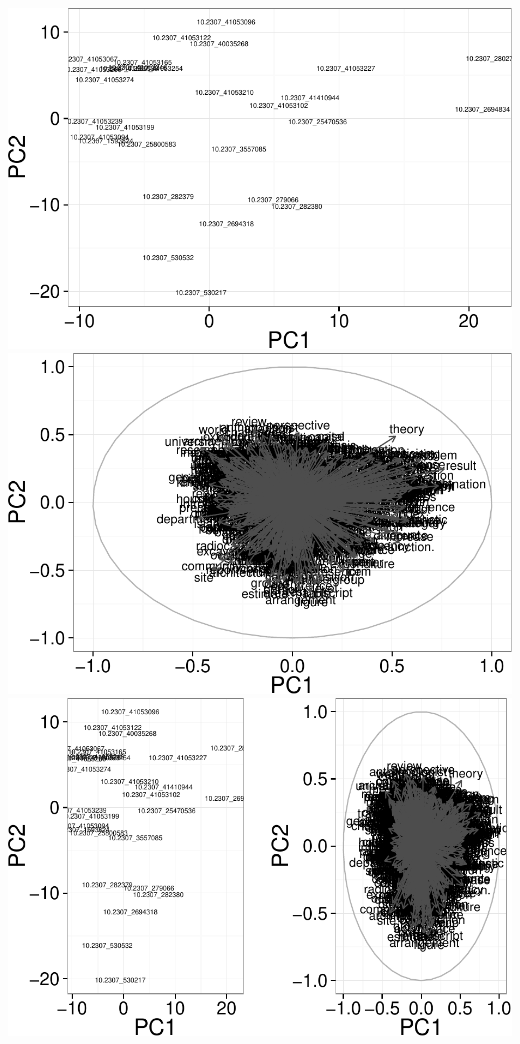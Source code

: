 \documentclass[10pt]{article}
\newenvironment{CodeChunk}{}{}
\begin{document}
\begin{CodeChunk}
\begin{CodeChunk}
\includegraphics{509Assignment_files/figure-latex/onegram3-24} 
\includegraphics{509Assignment_files/figure-latex/onegram3-25} 
\includegraphics{509Assignment_files/figure-latex/onegram3-26} 

\end{CodeChunk}
\end{CodeChunk}
\end{document}
